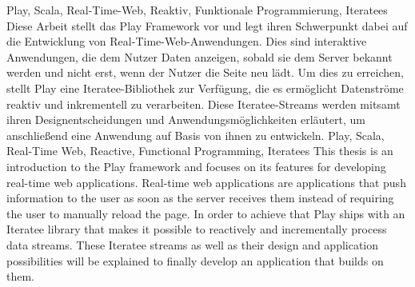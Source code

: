 \documentclass[draft=false
              ,paper=a4
              ,twoside=false
              ,fontsize=11pt
              ,headsepline
              ,BCOR10mm
              ,DIV11
              ]{scrbook}
\begin{document}
\lstset{language=Scala}


\frontmatter

\maketitle

\onehalfspacing

\HAWAbstractPage
{Play, Scala, Real-Time-Web, Reaktiv, Funktionale Programmierung, Iteratees}%
{
  Diese Arbeit stellt das Play Framework vor und legt ihren Schwerpunkt dabei auf die Entwicklung von Real-Time-Web-Anwendungen.
  Dies sind interaktive Anwendungen, die dem Nutzer Daten anzeigen, sobald sie dem Server bekannt werden und nicht erst, wenn der Nutzer die Seite neu lädt.
  Um dies zu erreichen, stellt Play eine Iteratee-Bibliothek zur Verfügung, die es ermöglicht Datenströme reaktiv und inkrementell zu verarbeiten.
  Diese Iteratee-Streams werden mitsamt ihren Designentscheidungen und Anwendungsmöglichkeiten erläutert, um anschließend eine Anwendung auf Basis von ihnen zu entwickeln.
}
{Play, Scala, Real-Time Web, Reactive, Functional Programming, Iteratees}%
{
  This thesis is an introduction to the Play framework and focuses on its features for developing real-time web applications.
  Real-time web applications are applications that push information to the user as soon as the server receives them instead of requiring the user to manually reload the page.
  In order to achieve that Play ships with an Iteratee library that makes it possible to reactively and incrementally process data streams.
  These Iteratee streams as well as their design and application possibilities will be explained to finally develop an application that builds on them.
}
\end{document}
